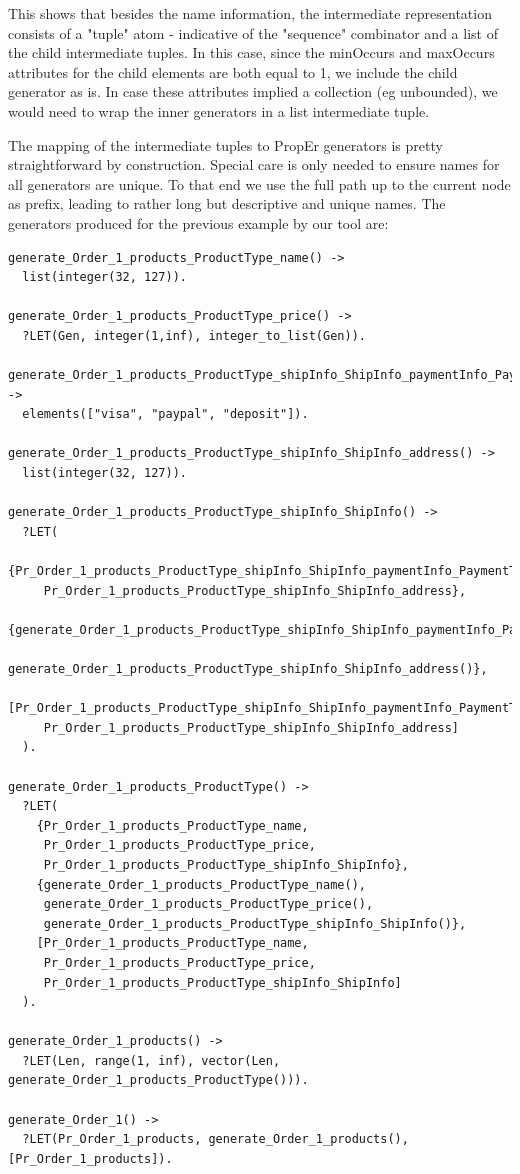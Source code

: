 \documentclass[submission,copyright,a4]{eptcs}
\begin{document}
This shows that besides the name information, the intermediate representation consists of a "tuple" atom - indicative of the "sequence" combinator and a list of the child intermediate tuples. In this case, since the minOccurs and maxOccurs attributes for the child elements are both equal to 1, we include the child generator as is. In case these attributes implied a collection (eg unbounded), we would need to wrap the inner generators in a list intermediate tuple.


The mapping of the intermediate tuples to PropEr generators is pretty straightforward by construction. Special care is only needed to ensure names for all generators are unique. To that end we use the full path up to the current node as prefix, leading to rather long but descriptive and unique names. The generators produced for the previous example by our tool are:

\begin{lstlisting}
generate_Order_1_products_ProductType_name() -> 
  list(integer(32, 127)).

generate_Order_1_products_ProductType_price() ->  
  ?LET(Gen, integer(1,inf), integer_to_list(Gen)).

generate_Order_1_products_ProductType_shipInfo_ShipInfo_paymentInfo_PaymentType() -> 
  elements(["visa", "paypal", "deposit"]).

generate_Order_1_products_ProductType_shipInfo_ShipInfo_address() -> 
  list(integer(32, 127)).

generate_Order_1_products_ProductType_shipInfo_ShipInfo() -> 
  ?LET(
    {Pr_Order_1_products_ProductType_shipInfo_ShipInfo_paymentInfo_PaymentType,
     Pr_Order_1_products_ProductType_shipInfo_ShipInfo_address},
    {generate_Order_1_products_ProductType_shipInfo_ShipInfo_paymentInfo_PaymentType(),
     generate_Order_1_products_ProductType_shipInfo_ShipInfo_address()},
    [Pr_Order_1_products_ProductType_shipInfo_ShipInfo_paymentInfo_PaymentType,
     Pr_Order_1_products_ProductType_shipInfo_ShipInfo_address]
  ).

generate_Order_1_products_ProductType() -> 
  ?LET(
    {Pr_Order_1_products_ProductType_name, 
     Pr_Order_1_products_ProductType_price, 
     Pr_Order_1_products_ProductType_shipInfo_ShipInfo},
    {generate_Order_1_products_ProductType_name(), 
     generate_Order_1_products_ProductType_price(), 
     generate_Order_1_products_ProductType_shipInfo_ShipInfo()},
    [Pr_Order_1_products_ProductType_name, 
     Pr_Order_1_products_ProductType_price, 
     Pr_Order_1_products_ProductType_shipInfo_ShipInfo] 
  ).

generate_Order_1_products() -> 
  ?LET(Len, range(1, inf), vector(Len, generate_Order_1_products_ProductType())).

generate_Order_1() -> 
  ?LET(Pr_Order_1_products, generate_Order_1_products(), [Pr_Order_1_products]).
\end{lstlisting}
\end{document}
